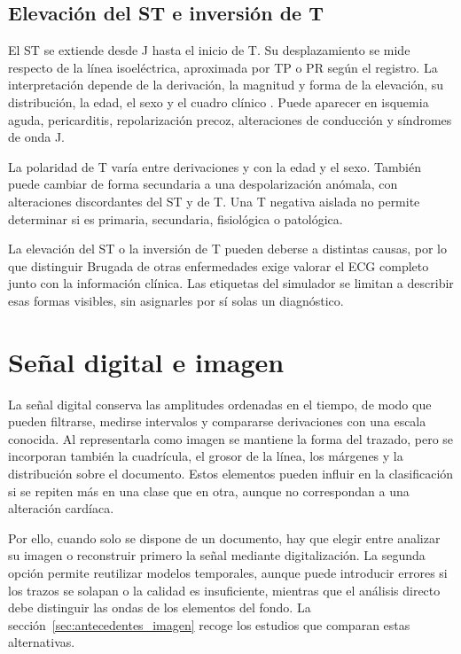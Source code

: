 \subsection{Elevación del ST e inversión de T}

El ST se extiende desde J hasta el inicio de T. Su desplazamiento se mide respecto de la línea isoeléctrica, aproximada por TP o PR según el registro. La interpretación depende de la derivación, la magnitud y forma de la elevación, su distribución, la edad, el sexo y el cuadro clínico \cite{rautaharju2009st}. Puede aparecer en isquemia aguda, pericarditis, repolarización precoz, alteraciones de conducción y síndromes de onda J.

La polaridad de T varía entre derivaciones y con la edad y el sexo. También puede cambiar de forma secundaria a una despolarización anómala, con alteraciones discordantes del ST y de T. Una T negativa aislada no permite determinar si es primaria, secundaria, fisiológica o patológica.

La elevación del ST o la inversión de T pueden deberse a distintas causas, por lo que distinguir Brugada de otras enfermedades exige valorar el ECG completo junto con la información clínica. Las etiquetas del simulador se limitan a describir esas formas visibles, sin asignarles por sí solas un diagnóstico.

\section{Señal digital e imagen}

La señal digital conserva las amplitudes ordenadas en el tiempo, de modo que pueden filtrarse, medirse intervalos y compararse derivaciones con una escala conocida. Al representarla como imagen se mantiene la forma del trazado, pero se incorporan también la cuadrícula, el grosor de la línea, los márgenes y la distribución sobre el documento. Estos elementos pueden influir en la clasificación si se repiten más en una clase que en otra, aunque no correspondan a una alteración cardíaca.

Por ello, cuando solo se dispone de un documento, hay que elegir entre analizar su imagen o reconstruir primero la señal mediante digitalización. La segunda opción permite reutilizar modelos temporales, aunque puede introducir errores si los trazos se solapan o la calidad es insuficiente, mientras que el análisis directo debe distinguir las ondas de los elementos del fondo. La sección~\ref{sec:antecedentes_imagen} recoge los estudios que comparan estas alternativas.

